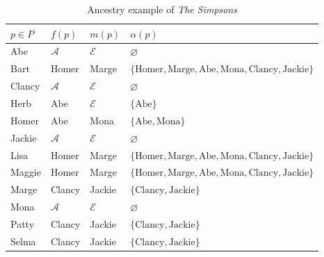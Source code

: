 \documentclass[letterpaper,11pt]{article}
\begin{document}
\begin{table}
    \centering
    \begin{tabular}{*{4}{l}}
        \toprule
        \(p \in P\) & \(f(p)\)        & \(m(p)\)        & \(\alpha(p)\)                                                                             \\
        \midrule
        Abe         & \(\mathcal{A}\) & \(\mathcal{E}\) & \(\varnothing\)                                                                           \\
        Bart        & Homer           & Marge           & \(\{\text{Homer}, \text{Marge}, \text{Abe}, \text{Mona}, \text{Clancy}, \text{Jackie}\}\) \\
        Clancy      & \(\mathcal{A}\) & \(\mathcal{E}\) & \(\varnothing\)                                                                           \\
        Herb        & Abe             & \(\mathcal{E}\) & \(\{\text{Abe}\}\)                                                                        \\
        Homer       & Abe             & Mona            & \(\{\text{Abe}, \text{Mona}\}\)                                                           \\
        Jackie      & \(\mathcal{A}\) & \(\mathcal{E}\) & \(\varnothing\)                                                                           \\
        Lisa        & Homer           & Marge           & \(\{\text{Homer}, \text{Marge}, \text{Abe}, \text{Mona}, \text{Clancy}, \text{Jackie}\}\) \\
        Maggie      & Homer           & Marge           & \(\{\text{Homer}, \text{Marge}, \text{Abe}, \text{Mona}, \text{Clancy}, \text{Jackie}\}\) \\
        Marge       & Clancy          & Jackie          & \(\{\text{Clancy}, \text{Jackie}\}\)                                                      \\
        Mona        & \(\mathcal{A}\) & \(\mathcal{E}\) & \(\varnothing\)                                                                           \\
        Patty       & Clancy          & Jackie          & \(\{\text{Clancy}, \text{Jackie}\}\)                                                      \\
        Selma       & Clancy          & Jackie          & \(\{\text{Clancy}, \text{Jackie}\}\)                                                      \\
        \bottomrule
    \end{tabular}
    \caption{Ancestry example of \textit{The Simpsons}}\label{table:simpsons}
\end{table}
\end{document}
